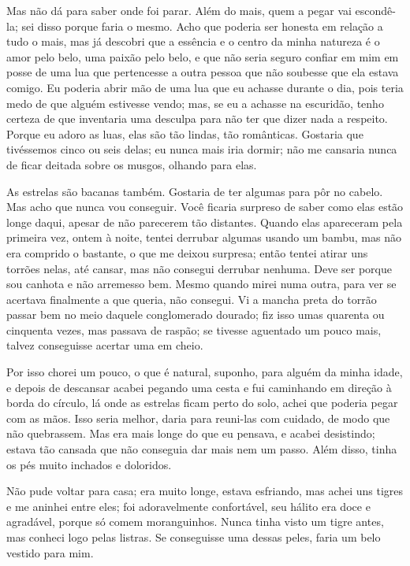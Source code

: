 Mas não dá para saber onde foi parar. Além do mais, quem a pegar vai
escondê-la; sei disso porque faria o mesmo. Acho que poderia ser honesta em
relação a tudo o mais, mas já descobri que a essência e o centro da minha
natureza é o amor pelo belo, uma paixão pelo belo, e que não seria seguro
confiar em mim em posse de uma lua que pertencesse a outra pessoa que não
soubesse que ela estava comigo. Eu poderia abrir mão de uma lua que eu achasse
durante o dia, pois teria medo de que alguém estivesse vendo; mas, se eu a
achasse na escuridão, tenho certeza de que inventaria uma desculpa para não ter
que dizer nada a respeito. Porque eu adoro as luas, elas são tão lindas,
tão românticas. Gostaria que tivéssemos cinco ou seis delas; eu nunca mais
iria dormir; não me cansaria nunca de ficar deitada sobre os musgos, olhando para elas.

As estrelas são bacanas também. Gostaria de ter algumas para pôr no cabelo. Mas
acho que nunca vou conseguir. Você ficaria surpreso de saber como elas estão longe daqui,
apesar de não parecerem tão distantes. Quando elas apareceram
pela primeira vez, ontem à noite, tentei derrubar algumas usando um bambu, mas
não era comprido o bastante, o que me deixou surpresa; então tentei atirar uns torrões
nelas, até cansar, mas não consegui derrubar nenhuma. Deve ser porque sou
canhota e não arremesso bem. Mesmo quando mirei numa outra, para ver se
acertava finalmente a que queria, não consegui. Vi a mancha preta do torrão
passar bem no meio daquele conglomerado dourado; fiz isso umas quarenta ou
cinquenta vezes, mas passava de raspão; se tivesse aguentado um
pouco mais, talvez conseguisse acertar uma em cheio.

Por isso chorei um pouco, o que é natural, suponho, para alguém da minha idade,
e depois de descansar acabei pegando uma cesta e fui caminhando em
direção à borda do círculo, lá onde as estrelas ficam perto do solo,
achei que poderia pegar com as mãos. Isso seria melhor, daria
para reuni-las com cuidado, de modo que não quebrassem. Mas era mais longe do que eu pensava, e
acabei desistindo; estava tão cansada que não conseguia dar mais nem um passo.
Além disso, tinha os pés muito inchados e doloridos.

Não pude voltar para casa; era muito longe, estava esfriando, mas achei uns
tigres e me aninhei entre eles; foi adoravelmente confortável, seu
hálito era doce e agradável, porque só comem moranguinhos. Nunca tinha visto um
tigre antes, mas conheci logo pelas listras. Se conseguisse uma
dessas peles, faria um belo vestido para mim.

